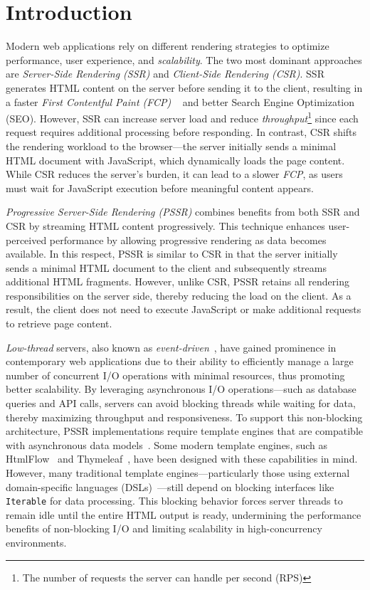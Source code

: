 \section{Introduction}


Modern web applications rely on different rendering strategies to optimize
performance, user experience, and \textit{scalability}. The two most dominant
approaches are \textit{Server-Side Rendering (SSR)} and \textit{Client-Side
    Rendering (CSR)}. SSR generates HTML content on the server before sending it to
the client, resulting in a faster \textit{First Contentful Paint (FCP)}
~\cite{Edgar2024-FCP} and better Search Engine Optimization (SEO). However, SSR
can increase server load and reduce \textit{throughput}\footnote{The number of
    requests the server can handle per second (RPS)} since each request requires
additional processing before responding. In contrast, CSR shifts the rendering
workload to the browser—the server initially sends a minimal HTML document with
JavaScript, which dynamically loads the page content. While CSR reduces the
server’s burden, it can lead to a slower \textit{FCP}, as users must wait for
JavaScript execution before meaningful content appears.

\textit{Progressive Server-Side Rendering (PSSR)} combines benefits from both SSR and CSR
by streaming HTML content progressively. This technique enhances user-perceived performance by
allowing progressive rendering as data becomes available. In this respect,
PSSR is similar to CSR in that the server initially sends a minimal HTML
document to the client and subsequently streams additional HTML fragments.
However, unlike CSR, PSSR retains all rendering responsibilities on the server side,
thereby reducing the load on the client. As a result, the client does
not need to execute JavaScript or make additional requests to retrieve page content.

\textit{Low-thread} servers, also known as
\textit{event-driven}~\cite{event-driven-servers}, have gained prominence in
contemporary web applications due to their ability to efficiently manage a large
number of concurrent I/O operations with minimal resources, thus promoting
better scalability.
By leveraging asynchronous I/O operations—such as
database queries and API calls, servers can avoid blocking threads while
waiting for data, thereby maximizing throughput and responsiveness. To support
this non-blocking architecture, PSSR implementations require template engines
that are compatible with asynchronous data models~\cite{carvalho2023async}.
Some modern template
engines, such as HtmlFlow~\cite{htmlflow} and Thymeleaf~\cite{thymeleaf}, have
been designed with these capabilities in mind. However, many traditional
template engines—particularly those using external domain-specific languages
(DSLs)~\cite{Fowler03}—still depend on blocking interfaces like
\texttt{Iterable} for data processing. This blocking behavior forces server
threads to remain idle until the entire HTML output is ready, undermining the
performance benefits of non-blocking I/O and limiting scalability in
high-concurrency environments. 

